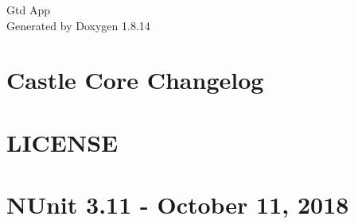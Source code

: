 \documentclass[twoside]{book}
\newcommand{\+}{\discretionary{\mbox{\scriptsize$\hookleftarrow$}}{}{}}
\newcommand{\clearemptydoublepage}{%
  \newpage{\pagestyle{empty}\cleardoublepage}%
}
\begin{document}
\hypersetup{pageanchor=false,
             bookmarksnumbered=true,
             pdfencoding=unicode
            }
\begin{titlepage}
\vspace*{7cm}
\begin{center}%
{\Large Gtd App }\\
\vspace*{1cm}
{\large Generated by Doxygen 1.8.14}\\
\end{center}
\end{titlepage}
\clearemptydoublepage
{}
\tableofcontents
\clearemptydoublepage
{}
\hypersetup{pageanchor=true}

\chapter{Castle Core Changelog}
\label{md__c_1__projects__o_e_oenik_prog3_2018_2_ep7d0o__o_e_n_i_k__p_r_o_g3_2018_2__e_p7_d0_o_packages8ad2e7294e2f42bb95e3b81991b3569d}

\chapter{L\+I\+C\+E\+N\+SE}
\label{md__c_1__projects__o_e_oenik_prog3_2018_2_ep7d0o__o_e_n_i_k__p_r_o_g3_2018_2__e_p7_d0_o_packages49dfbfe7c7601bfdae53879e3e2cc9e3}

\chapter{N\+Unit 3.11 -\/ October 11, 2018}
\label{md__c_1__projects__o_e_oenik_prog3_2018_2_ep7d0o__o_e_n_i_k__p_r_o_g3_2018_2__e_p7_d0_o_packages5cdfbe88207ce380d4cdccfb82c0c269}

\end{document}
